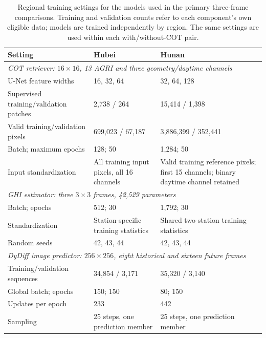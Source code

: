 \begin{table}[!htbp]\centering\small
\caption{Regional training settings for the models used in the primary three-frame comparisons. Training and validation counts refer to each component's own eligible data; models are trained independently by region. The same settings are used within each with/without-COT pair.}\label{tab:training}
\begin{tabularx}{\linewidth}{p{42mm}XX}\toprule
Setting & Hubei & Hunan\\\midrule
\multicolumn{3}{l}{\textit{COT retriever: $16\times16$, 13 AGRI and three geometry/daytime channels}}\\
U-Net feature widths & 16, 32, 64 & 32, 64, 128\\
Supervised training/validation patches & 2,738 / 264 & 15,414 / 1,398\\
Valid training/validation pixels & 699,023 / 67,187 & 3,886,399 / 352,441\\
Batch; maximum epochs & 128; 50 & 1,284; 50\\
Input standardization & All training input pixels, all 16 channels & Valid training reference pixels; first 15 channels; binary daytime channel retained\\
\midrule
\multicolumn{3}{l}{\textit{GHI estimator: three $3\times3$ frames, 42,529 parameters}}\\
Batch; epochs & 512; 30 & 1,792; 30\\
Standardization & Station-specific training statistics & Shared two-station training statistics\\
Random seeds & 42, 43, 44 & 42, 43, 44\\
\midrule
\multicolumn{3}{l}{\textit{DyDiff image predictor: $256\times256$, eight historical and sixteen future frames}}\\
Training/validation sequences & 34,854 / 3,171 & 35,320 / 3,140\\
Global batch; epochs & 150; 150 & 80; 150\\
Updates per epoch & 233 & 442\\
Sampling & 25 steps, one prediction member & 25 steps, one prediction member\\\bottomrule
\end{tabularx}
\end{table}

